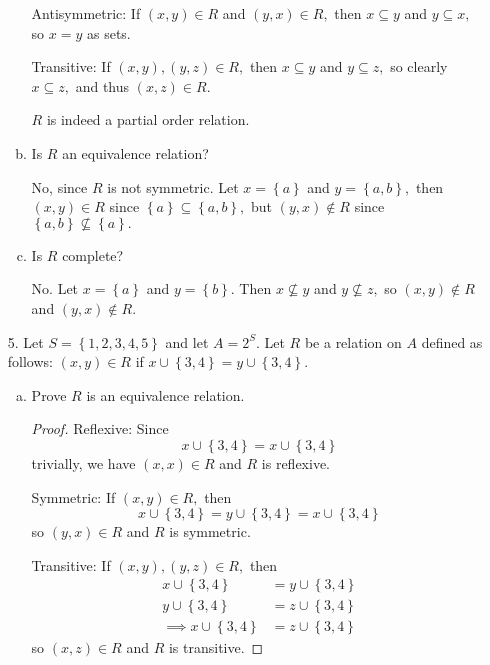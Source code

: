 \documentclass{article}
\begin{document}
\begin{itemize}
\begin{enumerate}[(a)]
\begin{soln}
					Antisymmetric: If $(x, y)\in R$ and $(y, x)\in R,$ then $x\subseteq y$ and $y\subseteq x,$ so $x=y$ as sets.

					Transitive: If $(x, y), (y, z)\in R,$ then $x\subseteq y$ and $y\subseteq z,$ so clearly $x\subseteq z,$ and thus $(x, z)\in R.$

					$R$ is indeed a partial order relation.
				\end{soln}

			\item Is $R$ an equivalence relation?
				\begin{soln}
					No, since $R$ is not symmetric. Let $x=\left\{ a \right\}$ and $y=\left\{ a, b \right\},$ then $(x, y)\in R$ since $\left\{ a \right\}\subseteq \left\{ a, b \right\},$ but $(y, x)\notin R$ since $\left\{ a, b \right\}\nsubseteq \left\{ a \right\}.$
				\end{soln}

			\item Is $R$ complete?
				\begin{soln}
					No. Let $x=\left\{ a \right\}$ and $y=\left\{ b \right\}.$ Then $x\nsubseteq y$ and $y\nsubseteq z,$ so $(x, y)\notin R$ and $(y, x)\notin R.$
				\end{soln}
				
		\end{enumerate}

	\item[5.] Let $S=\left\{ 1, 2, 3, 4, 5 \right\}$ and let $A=2^S.$ Let $R$ be a relation on $A$ defined as follows: $(x, y)\in R$ if $x\cup \left\{ 3, 4 \right\}=y\cup\left\{ 3, 4 \right\}.$
		\begin{enumerate}[(a)]
			\item Prove $R$ is an equivalence relation.
				\begin{proof}
					Reflexive: Since
					\[x\cup\left\{ 3, 4 \right\}=x\cup \left\{ 3, 4 \right\}\]
					trivially, we have $(x, x)\in R$ and $R$ is reflexive.

					Symmetric: If $(x, y)\in R,$ then
					\[x\cup \left\{ 3, 4 \right\}=y\cup \left\{ 3, 4 \right\} = x\cup \left\{ 3, 4 \right\}\]
					so $(y, x)\in R$ and $R$ is symmetric.

					Transitive: If $(x, y), (y, z)\in R,$ then
					\begin{align*}
						x\cup \left\{ 3, 4 \right\} &= y\cup \left\{ 3, 4 \right\} \\
						y\cup \left\{ 3, 4 \right\} &= z\cup \left\{ 3, 4 \right\} \\
						\implies x\cup \left\{ 3, 4 \right\} &= z\cup \left\{ 3, 4 \right\}
					\end{align*}
					so $(x, z)\in R$ and $R$ is transitive.


\end{proof}
\end{enumerate}
\end{itemize}
\end{document}
